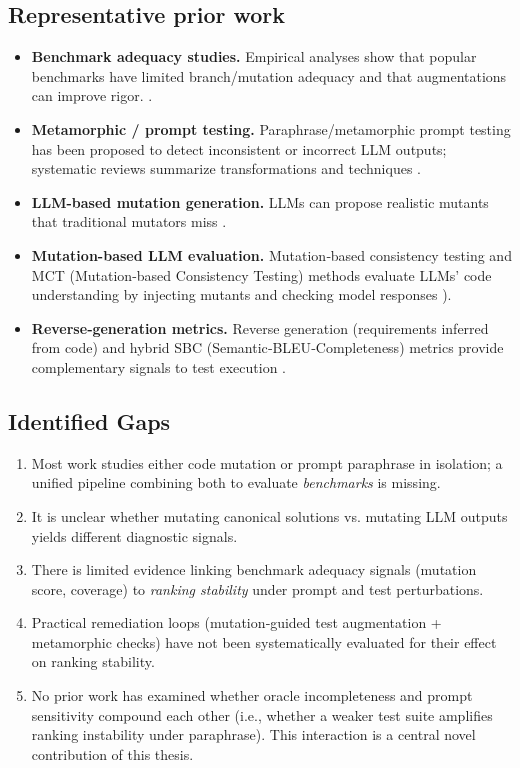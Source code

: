 \documentclass[11pt,a4paper]{article}
\begin{document}
\subsection{Representative prior work}
\begin{itemize}[noitemsep]
  \item \textbf{Benchmark adequacy studies.} Empirical analyses show that popular benchmarks have limited branch/mutation adequacy and that augmentations can improve rigor. \cite{liu2025evaluating}. 

  \item \textbf{Metamorphic / prompt testing.} Paraphrase/metamorphic prompt testing has been proposed to detect inconsistent or incorrect LLM outputs; systematic reviews summarize transformations and techniques \cite{asgari2025metamorphic} \cite{pan2025re}.
  \item \textbf{LLM-based mutation generation.} LLMs can propose realistic mutants that traditional mutators miss \cite{tip2025llmorpheus}.
  \item \textbf{Mutation-based LLM evaluation.} Mutation‑based consistency testing and MCT (Mutation-based Consistency Testing) methods evaluate LLMs’ code understanding by injecting mutants and checking model responses \cite{li2024mutation}).
  \item \textbf{Reverse‑generation metrics.} Reverse generation (requirements inferred from code) and hybrid SBC (Semantic‑BLEU‑Completeness) metrics provide complementary signals to test execution \cite{ponnusamy2025bridging}.
\end{itemize}

\subsection{Identified Gaps}
\begin{enumerate}[noitemsep]
  \item Most work studies either code mutation or prompt paraphrase in isolation; a unified pipeline combining both to evaluate \emph{benchmarks} is missing.
  \item It is unclear whether mutating canonical solutions vs. mutating LLM outputs yields different diagnostic signals.
  \item There is limited evidence linking benchmark adequacy signals (mutation score, coverage) to \emph{ranking stability} under prompt and test perturbations.
  \item Practical remediation loops (mutation‑guided test augmentation + metamorphic checks) have not been systematically evaluated for their effect on ranking stability.
  \item No prior work has examined whether oracle incompleteness and prompt sensitivity compound each other (i.e., whether a weaker test suite amplifies ranking instability under paraphrase). This interaction is a central novel contribution of this thesis.
\end{enumerate}
\newpage
\end{document}
